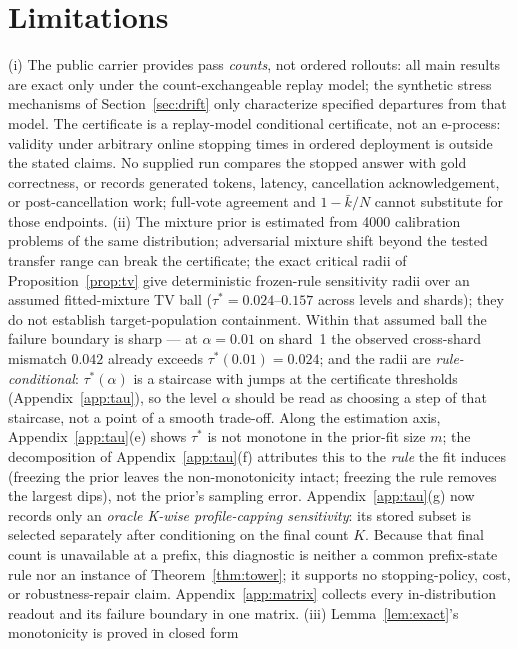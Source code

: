 \documentclass{article}
\theoremstyle{definition}
\theoremstyle{remark}
\begin{document}
\section{Limitations}
\label{sec:limits}
(i) The public carrier provides pass \emph{counts}, not ordered rollouts: all
main results are exact only under the count-exchangeable replay model; the
synthetic stress mechanisms of Section~\ref{sec:drift} only characterize
specified departures from that model. The certificate is a replay-model conditional
certificate, not an e-process: validity under arbitrary online stopping
times in ordered deployment is outside the stated claims. No supplied run
compares the stopped answer with gold correctness, or records generated tokens,
latency, cancellation acknowledgement, or post-cancellation work; full-vote
agreement and $1-\bar k/N$ cannot substitute for those endpoints. (ii) The mixture prior is estimated from 4000
calibration problems of the same distribution; adversarial mixture shift
beyond the tested transfer range can break the certificate; the exact
critical radii of Proposition~\ref{prop:tv} give deterministic frozen-rule
sensitivity radii over an assumed fitted-mixture TV ball
($\tau^*=0.024$--$0.157$ across levels and shards); they do not establish
target-population containment.  Within that assumed ball the failure boundary
is sharp --- at $\alpha=0.01$ on shard~1 the observed cross-shard
mismatch $0.042$ already exceeds $\tau^*(0.01)=0.024$; and the radii are
\emph{rule-conditional}: $\tau^*(\alpha)$ is a staircase with jumps at the
certificate thresholds (Appendix~\ref{app:tau}), so the level $\alpha$
should be read as choosing a step of that staircase, not a point of a
smooth trade-off. Along the estimation axis, Appendix~\ref{app:tau}(e)
shows $\tau^*$ is not monotone in the prior-fit size $m$; the
decomposition of Appendix~\ref{app:tau}(f) attributes this to the
\emph{rule} the fit induces (freezing the prior leaves the
non-monotonicity intact; freezing the rule removes the largest dips),
not the prior's sampling error. Appendix~\ref{app:tau}(g) now records only
an \emph{oracle K-wise profile-capping sensitivity}: its stored subset is
selected separately after conditioning on the final count $K$. Because that
final count is unavailable at a prefix, this diagnostic is neither a common
prefix-state rule nor an instance of Theorem~\ref{thm:tower}; it supports no
stopping-policy, cost, or robustness-repair claim.
Appendix~\ref{app:matrix} collects every in-distribution readout and its
failure boundary in one matrix.
(iii) Lemma~\ref{lem:exact}'s monotonicity is proved in closed form
\end{document}
